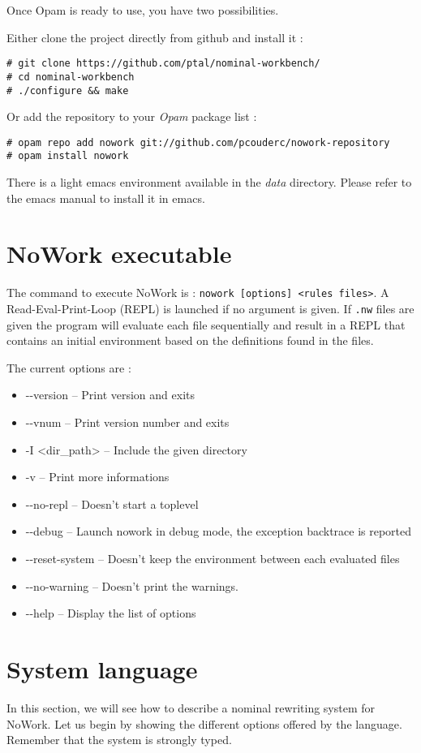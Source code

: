 \documentclass[12pt,a4paper]{article}
\begin{document}
Once Opam is ready to use, you have two possibilities. 

Either clone the project directly from github and install it :
\begin{verbatim}
# git clone https://github.com/ptal/nominal-workbench/
# cd nominal-workbench
# ./configure && make
\end{verbatim}

Or add the repository to your \emph{Opam} package list :
\begin{verbatim}
# opam repo add nowork git://github.com/pcouderc/nowork-repository
# opam install nowork
\end{verbatim}

There is a light emacs environment available in the \emph{data}
directory. Please refer to the emacs manual to install it in emacs.

\section{NoWork executable}

The command to execute NoWork is : \texttt{nowork [options] <rules
  files>}.  A Read-Eval-Print-Loop (REPL) is launched if no argument
is given. If \texttt{.nw} files are given the program will evaluate
each file sequentially and result in a REPL that contains an initial
environment based on the definitions found in the files.

The current options are :
\begin{itemize}
\item -{}-version -- Print version and exits
\item -{}-vnum -- Print version number and exits
\item -I <dir\_path> -- Include the given directory
\item -v -- Print more informations
\item -{}-no-repl -- Doesn't start a toplevel
\item -{}-debug -- Launch nowork in debug mode, the exception backtrace is reported
\item -{}-reset-system -- Doesn't keep the environment between each evaluated files
\item -{}-no-warning -- Doesn't print the warnings.
\item -{}-help -- Display the list of options
\end{itemize}

\section{System language}
In this section, we will see how to describe a nominal rewriting
system for NoWork. Let us begin by showing the different options
offered by the language. Remember that the system is strongly typed.
\end{document}
